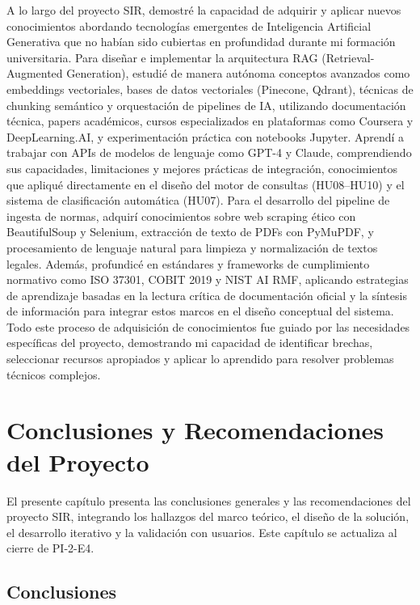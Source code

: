 \documentclass[12pt,a4paper,oneside]{report}
\begin{document}
A lo largo del proyecto SIR, demostré la capacidad de adquirir y aplicar nuevos conocimientos abordando tecnologías emergentes de Inteligencia Artificial Generativa que no habían sido cubiertas en profundidad durante mi formación universitaria. Para diseñar e implementar la arquitectura RAG (Retrieval-Augmented Generation), estudié de manera autónoma conceptos avanzados como embeddings vectoriales, bases de datos vectoriales (Pinecone, Qdrant), técnicas de chunking semántico y orquestación de pipelines de IA, utilizando documentación técnica, papers académicos, cursos especializados en plataformas como Coursera y DeepLearning.AI, y experimentación práctica con notebooks Jupyter. Aprendí a trabajar con APIs de modelos de lenguaje como GPT-4 y Claude, comprendiendo sus capacidades, limitaciones y mejores prácticas de integración, conocimientos que apliqué directamente en el diseño del motor de consultas (HU08--HU10) y el sistema de clasificación automática (HU07). Para el desarrollo del pipeline de ingesta de normas, adquirí conocimientos sobre web scraping ético con BeautifulSoup y Selenium, extracción de texto de PDFs con PyMuPDF, y procesamiento de lenguaje natural para limpieza y normalización de textos legales. Además, profundicé en estándares y frameworks de cumplimiento normativo como ISO 37301, COBIT 2019 y NIST AI RMF, aplicando estrategias de aprendizaje basadas en la lectura crítica de documentación oficial y la síntesis de información para integrar estos marcos en el diseño conceptual del sistema. Todo este proceso de adquisición de conocimientos fue guiado por las necesidades específicas del proyecto, demostrando mi capacidad de identificar brechas, seleccionar recursos apropiados y aplicar lo aprendido para resolver problemas técnicos complejos.

\chapter{Conclusiones y Recomendaciones del Proyecto}\label{cap:9-conclusiones-y-recomendaciones-del-proyecto}

El presente capítulo presenta las conclusiones generales y las recomendaciones del proyecto SIR, integrando los hallazgos del marco teórico, el diseño de la solución, el desarrollo iterativo y la validación con usuarios. Este capítulo se actualiza al cierre de PI-2-E4.

\section{Conclusiones}\label{sec:conclusiones-4}
\end{document}
